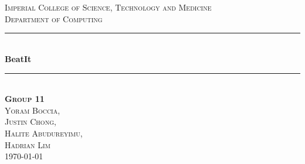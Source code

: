 \documentclass[a4paper]{article}
\begin{document}
\begin{titlepage}

\newcommand{\HRule}{\rule{\linewidth}{0.5mm}} %
\setlength{\topmargin}{0in}
\center %
 
 
 \begin{minipage}{0.4\textwidth}
\begin{flushleft} \large
\hspace*{-0.5cm}
\end{flushleft}
\end{minipage}
~
\begin{minipage}{0.5\textwidth}
\begin{flushright} \large
\hspace*{2cm}
\end{flushright}
\end{minipage}\\[1cm]

\textsc{\LARGE Imperial College of Science, Technology and Medicine}\\[1.5cm] %
\textsc{\Large Department of Computing}\\[0.5cm] %


\HRule \\[0.4cm]
{ \huge \bfseries BeatIt}\\[0.4cm] %
\HRule \\[1cm]
 

\textsc{{\large
\textbf{Group 11} \\
Yoram \textsc{Boccia}, \\
Justin \textsc{Chong}, \\ 
Halite \textsc{Abudureyimu}, \\
Hadrian \textsc{Lim} }}\\[0.5cm]


{\large \today}\\[0.5cm] %


\vfill %

\end{titlepage}
\end{document}
